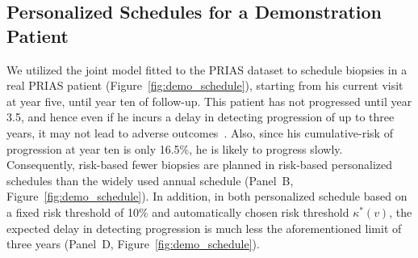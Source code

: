\subsection{Personalized Schedules for a Demonstration Patient}
We utilized the joint model fitted to the PRIAS dataset to schedule biopsies in a real PRIAS patient (Figure~\ref{fig:demo_schedule}), starting from his current visit at year five, until year ten of follow-up. This patient has not progressed until year 3.5, and hence even if he incurs a delay in detecting progression of up to three years, it may not lead to adverse outcomes~\citep{carvalho}. Also, since his cumulative-risk of progression at year ten is only 16.5\%, he is likely to progress slowly. Consequently, risk-based fewer biopsies are planned in risk-based personalized schedules than the widely used annual schedule (Panel~B, Figure~\ref{fig:demo_schedule}). In addition, in both personalized schedule based on a fixed risk threshold of 10\% and automatically chosen risk threshold $\kappa^*(v)$, the expected delay in detecting progression is much less the aforementioned limit of three years (Panel~D, Figure~\ref{fig:demo_schedule}).
